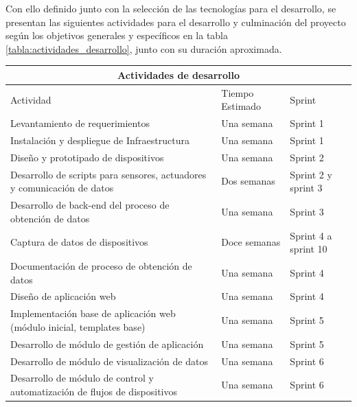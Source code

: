 Con ello definido junto con la selección de las tecnologías para el desarrollo, se presentan las siguientes actividades para el desarrollo y culminación del proyecto según los objetivos generales y específicos en la  tabla \ref{tabla:actividades_desarrollo}, junto con su duración aproximada.

\begin{table}[!htb]
\centering
\begin{tabular}{| m{6.5cm}| m{3.5cm}| m{4cm}|}
\hline
\multicolumn{3}{|c|}{Actividades de desarrollo} \\
\hline 
\centering Actividad & \centering Tiempo Estimado & \centering Sprint \tabularnewline \hline

Levantamiento de requerimientos & Una semana & Sprint 1 \\ \hline

Instalación y despliegue de Infraestructura & Una semana & Sprint 1 \\ \hline

Diseño y prototipado de dispositivos & Una semana & Sprint 2 \\ \hline

Desarrollo de scripts para sensores, actuadores y comunicación de datos & Dos semanas & Sprint 2 y sprint 3\\ \hline

Desarrollo de back-end del proceso de obtención de datos & Una semana & Sprint 3  \\ \hline

Captura de datos de dispositivos & Doce semanas & Sprint 4 a sprint 10 \\ \hline

Documentación de proceso de obtención de datos & Una semana & Sprint 4 \\ \hline

Diseño de aplicación web & Una semana & Sprint 4 \\ \hline

Implementación base de aplicación web (módulo inicial, templates base) & Una semana & Sprint 5 \\ \hline

Desarrollo de módulo de gestión de aplicación & Una semana & Sprint 5 \\ \hline

Desarrollo de módulo de visualización de datos & Una semana & Sprint 6\\ \hline

Desarrollo de módulo de control y automatización de flujos de dispositivos & Una semana & Sprint 6\\ \hline


\end{tabular}
\end{table}
